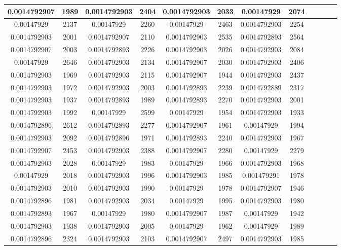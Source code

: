 \begin{table}[h]
\begin{tabular}{|c|c|c|c|c|c|c|c|c|c|c|c|}
\midrule
0.0014792907&1989&0.0014792903&2404&0.0014792903&2033&0.00147929&2074\\
\midrule
0.00147929&2137&0.00147929&2260&0.00147929&2463&0.0014792903&2254\\
\midrule
0.0014792903&2001&0.0014792907&2110&0.0014792903&2535&0.0014792893&2564\\
\midrule
0.0014792907&2003&0.0014792893&2226&0.0014792903&2026&0.0014792903&2084\\
\midrule
0.00147929&2646&0.0014792903&2134&0.0014792907&2030&0.0014792903&2406\\
\midrule
0.0014792903&1969&0.0014792903&2115&0.0014792907&1944&0.0014792903&2437\\
\midrule
0.0014792903&1972&0.0014792903&2003&0.0014792893&2239&0.0014792889&2317\\
\midrule
0.0014792903&1937&0.0014792893&1989&0.0014792893&2270&0.0014792903&2001\\
\midrule
0.0014792903&1992&0.00147929&2599&0.00147929&1954&0.0014792903&1933\\
\midrule
0.0014792896&2612&0.0014792893&2277&0.0014792907&1961&0.00147929&1994\\
\midrule
0.0014792903&2092&0.0014792896&1971&0.0014792893&2240&0.0014792903&1967\\
\midrule
0.0014792907&2453&0.0014792903&2388&0.0014792907&2280&0.00147929&2279\\
\midrule
0.0014792903&2028&0.00147929&1983&0.00147929&1966&0.0014792903&1968\\
\midrule
0.00147929&2018&0.0014792903&1996&0.0014792903&1985&0.001479291&1978\\
\midrule
0.0014792903&2010&0.0014792903&1990&0.00147929&1978&0.0014792907&1946\\
\midrule
0.0014792896&1981&0.0014792903&2034&0.00147929&1995&0.0014792903&1980\\
\midrule
0.0014792893&1967&0.00147929&1980&0.0014792907&1987&0.00147929&1942\\
\midrule
0.0014792903&1938&0.0014792903&2005&0.00147929&1962&0.00147929&1989\\
\midrule
0.0014792896&2324&0.0014792903&2103&0.0014792907&2497&0.0014792903&1985\\
\midrule
\end{tabular}

\end{table}
